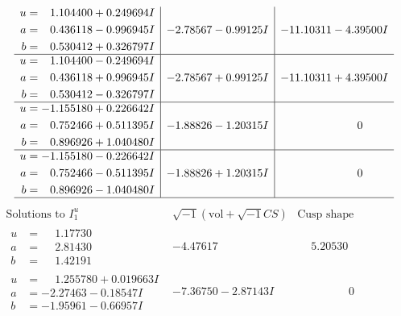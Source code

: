 \documentclass[1p]{elsarticle_modified}
\theoremstyle{definition}
\newcommand{\I}{\sqrt{-1}}
\begin{document}
$$\begin{array}{c|c|c}
\begin{aligned}
u &= \phantom{-}1.104400 + 0.249694 I \\
a &= \phantom{-}0.436118 - 0.996945 I \\
b &= \phantom{-}0.530412 + 0.326797 I\end{aligned}
 & -2.78567 - 0.99125 I & -11.10311 - 4.39500 I \\ \hline\begin{aligned}
u &= \phantom{-}1.104400 - 0.249694 I \\
a &= \phantom{-}0.436118 + 0.996945 I \\
b &= \phantom{-}0.530412 - 0.326797 I\end{aligned}
 & -2.78567 + 0.99125 I & -11.10311 + 4.39500 I \\ \hline\begin{aligned}
u &= -1.155180 + 0.226642 I \\
a &= \phantom{-}0.752466 + 0.511395 I \\
b &= \phantom{-}0.896926 + 1.040480 I\end{aligned}
 & -1.88826 - 1.20315 I & \phantom{-0.000000 } 0 \\ \hline\begin{aligned}
u &= -1.155180 - 0.226642 I \\
a &= \phantom{-}0.752466 - 0.511395 I \\
b &= \phantom{-}0.896926 - 1.040480 I\end{aligned}
 & -1.88826 + 1.20315 I & \phantom{-0.000000 } 0\\
 \hline 
 \end{array}$$\newpage$$\begin{array}{c|c|c}  
\text{Solutions to }I^u_{1}& \I (\text{vol} + \sqrt{-1}CS) & \text{Cusp shape}\\
 \hline 
\begin{aligned}
u &= \phantom{-}1.17730\phantom{ +0.000000I} \\
a &= \phantom{-}2.81430\phantom{ +0.000000I} \\
b &= \phantom{-}1.42191\phantom{ +0.000000I}\end{aligned}
 & -4.47617\phantom{ +0.000000I} & \phantom{-}5.20530\phantom{ +0.000000I} \\ \hline\begin{aligned}
u &= \phantom{-}1.255780 + 0.019663 I \\
a &= -2.27463 - 0.18547 I \\
b &= -1.95961 - 0.66957 I\end{aligned}
 & -7.36750 - 2.87143 I & \phantom{-0.000000 } 0 \\ \hline\begin{aligned}

\end{aligned}
\end{array}$$
\end{document}
